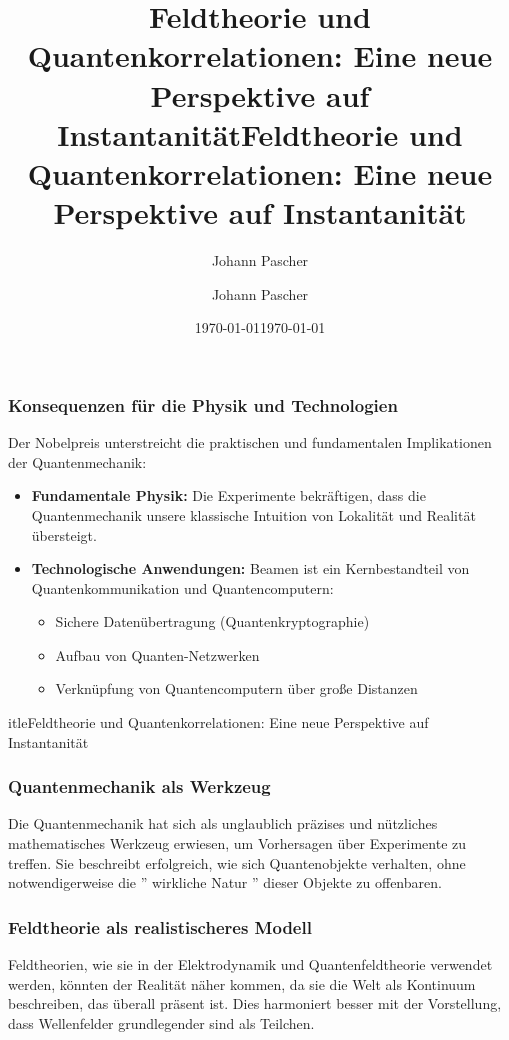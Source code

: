 \documentclass[12pt,a4paper]{article}
\begin{document}
	\subsubsection{Konsequenzen für die Physik und Technologien}
	Der Nobelpreis unterstreicht die praktischen und fundamentalen Implikationen der Quantenmechanik:
	\begin{itemize}
		\item \textbf{Fundamentale Physik:} Die Experimente bekräftigen, dass die Quantenmechanik unsere klassische Intuition von Lokalität und Realität übersteigt.
		\item \textbf{Technologische Anwendungen:} Beamen ist ein Kernbestandteil von Quantenkommunikation und Quantencomputern:
		\begin{itemize}
			\item Sichere Datenübertragung (Quantenkryptographie)
			\item Aufbau von Quanten-Netzwerken
			\item Verknüpfung von Quantencomputern über große Distanzen
		\end{itemize}
	\end{itemize}
	
	
		itle{Feldtheorie und Quantenkorrelationen: Eine neue Perspektive auf Instantanität}
	
	
	
\title{Feldtheorie und Quantenkorrelationen: Eine neue Perspektive auf Instantanität}
\author{Johann Pascher}
\date{\today}


\title{Feldtheorie und Quantenkorrelationen: Eine neue Perspektive auf Instantanität}
\author{Johann Pascher}
\date{\today}

\maketitle
	
	\subsubsection{Quantenmechanik als Werkzeug}
	Die Quantenmechanik hat sich als unglaublich präzises und nützliches mathematisches Werkzeug erwiesen, um Vorhersagen über Experimente zu treffen. Sie beschreibt erfolgreich, wie sich Quantenobjekte verhalten, ohne notwendigerweise die '' wirkliche Natur '' dieser Objekte zu offenbaren.
	
	\subsubsection{Feldtheorie als realistischeres Modell}
	Feldtheorien, wie sie in der Elektrodynamik und Quantenfeldtheorie verwendet werden, könnten der Realität näher kommen, da sie die Welt als Kontinuum beschreiben, das überall präsent ist. Dies harmoniert besser mit der Vorstellung, dass Wellenfelder grundlegender sind als Teilchen.
	
\end{document}
